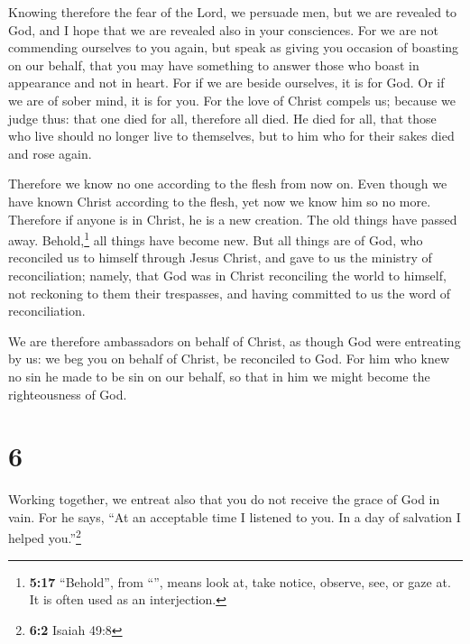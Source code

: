  Knowing therefore the fear of the Lord, we persuade men,
but we are revealed to God, and I hope that we are revealed also in your
consciences.  For we are not commending ourselves to you
again, but speak as giving you occasion of boasting on our behalf, that
you may have something to answer those who boast in appearance and not
in heart.  For if we are beside ourselves, it is for God.
Or if we are of sober mind, it is for you.  For the love
of Christ compels us; because we judge thus: that one died for all,
therefore all died.  He died for all, that those who live
should no longer live to themselves, but to him who for their sakes died
and rose again.

 Therefore we know no one according to the flesh from now
on. Even though we have known Christ according to the flesh, yet now we
know him so no more.  Therefore if anyone is in Christ,
he is a new creation. The old things have passed away.
Behold,\footnote{\textbf{5:17} ``Behold'', from ``'', means
  look at, take notice, observe, see, or gaze at. It is often used as an
  interjection.} all things have become new.  But all
things are of God, who reconciled us to himself through Jesus Christ,
and gave to us the ministry of reconciliation;  namely,
that God was in Christ reconciling the world to himself, not reckoning
to them their trespasses, and having committed to us the word of
reconciliation.

 We are therefore ambassadors on behalf of Christ, as
though God were entreating by us: we beg you on behalf of Christ, be
reconciled to God.  For him who knew no sin he made to be
sin on our behalf, so that in him we might become the righteousness of
God.

\hypertarget{section-5}{%
\section{6}\label{section-5}}

 Working together, we entreat also that you do not receive
the grace of God in vain.  For he says, ``At an acceptable
time I listened to you. In a day of salvation I helped you.''\footnote{\textbf{6:2}
  Isaiah 49:8}

